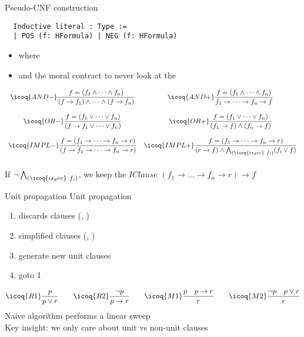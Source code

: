 \documentclass{beamer}
\newcommand{\xmark}{\ding{55}}%
\begin{document}
\begin{frame}[fragile]{Pseudo-CNF construction}
\begin{verbatim}
  Inductive literal : Type :=
  | POS (f: HFormula) | NEG (f: HFormula)
\end{verbatim}
\begin{itemize}
\item where 
\item and the moral contract to never look at the 
\end{itemize}


\[
  \begin{array}{cc}
  \icoq{AND-} \dfrac{ f = (f_1 \land \dots \land f_n) }
  { (f \to f_1) \land \dots \land (f \to f_n) } &
    \icoq{AND+} \dfrac{ f = (f_1 \land \dots \land f_n) }
    { f_1 \to \dots \to f_n \to f } \\\\
    \icoq{OR-}  \dfrac{ f = (f_1 \lor \dots \lor f_n) }
    { (f \to f_1 \lor \dots \lor f_n) } &
    \icoq{OR+}  \dfrac{ f = (f_1 \lor \dots \lor f_n) }
    { (f_1 \to  f) \land  (f_n \to f) }\\\\
    \icoq{IMPL-}  \dfrac{ f = (f_1 \to \dots \to f_n \to r) }
                   { (f \to f_1 \to \dots \to f_n \to r) } &
    \icoq{IMPL+}  \dfrac{ f = (f_1 \to \dots \to f_n \to r) }
                   { (r \to f) \land \bigwedge_{(\icoq{is_dec}\ f_i)} (f_i \lor f)   }\\\\
  \end{array}
\]
If  $\neg \bigwedge_{(\icoq{is_dec}\ f_i)}$, we keep the $\mathit{IClause}$
$
(f_1 \to \dots \to f_n \to r) \to f
$
\end{frame}

\begin{frame}[fragile]{Unit propagation}
Unit propagation
\begin{enumerate}
\item discards clauses (, )
\item simplified clauses (, )
\item generate new unit clauses
\item goto 1
\end{enumerate}
\[
  \icoq{R1}\dfrac{ p }{ p \lor r } \qquad
  \icoq{R2}\dfrac {\neg p }{ p \to r } \qquad 
  \icoq{M1}\dfrac{p \quad p \to r}
  { r }  \qquad
  \icoq{M2}\dfrac{\neg p \quad p \lor r}{r} 
\]
Naive algorithm performs a linear sweep \xmark\\
Key insight: we only care about unit vs non-unit clauses
\end{frame}
\end{document}
